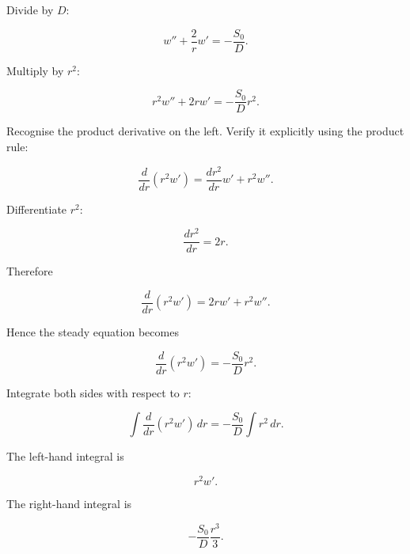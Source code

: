 \documentclass[11pt,a4paper]{article}
\begin{document}
Divide by $D$:

\begin{equation}
w''
+
\frac2r w'
=
-\frac{S_0}{D}.
\tag{TRISO-ANA-104}
\label{eq:triso-ana-104}
\end{equation}

Multiply by $r^2$:

\begin{equation}
r^2w''
+
2rw'
=
-\frac{S_0}{D}r^2.
\tag{TRISO-ANA-105}
\label{eq:triso-ana-105}
\end{equation}

Recognise the product derivative on the left. Verify it explicitly using the product rule:

\begin{equation}
\frac{d}{dr}(r^2w')
=
\frac{d r^2}{dr}w'
+
r^2w''.
\tag{TRISO-ANA-106}
\label{eq:triso-ana-106}
\end{equation}

Differentiate $r^2$:

\begin{equation}
\frac{d r^2}{dr}=2r.
\tag{TRISO-ANA-107}
\label{eq:triso-ana-107}
\end{equation}

Therefore

\begin{equation}
\frac{d}{dr}(r^2w')
=
2rw'+r^2w''.
\tag{TRISO-ANA-108}
\label{eq:triso-ana-108}
\end{equation}

Hence the steady equation becomes

\begin{equation}
\frac{d}{dr}(r^2w')
=
-\frac{S_0}{D}r^2.
\tag{TRISO-ANA-109}
\label{eq:triso-ana-109}
\end{equation}

Integrate both sides with respect to $r$:

\begin{equation}
\int
\frac{d}{dr}(r^2w')\,dr
=
-\frac{S_0}{D}
\int r^2\,dr.
\tag{TRISO-ANA-110}
\label{eq:triso-ana-110}
\end{equation}

The left-hand integral is

\begin{equation}
r^2w'.
\tag{TRISO-ANA-111}
\label{eq:triso-ana-111}
\end{equation}

The right-hand integral is

\begin{equation}
-\frac{S_0}{D}\frac{r^3}{3}.
\tag{TRISO-ANA-112}
\label{eq:triso-ana-112}
\end{equation}
\end{document}
